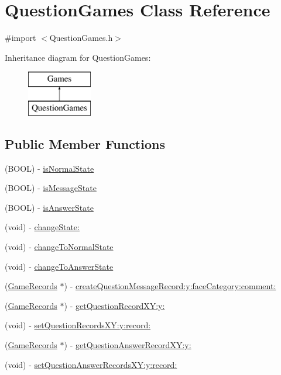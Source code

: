 \hypertarget{interface_question_games}{
\section{QuestionGames Class Reference}
\label{interface_question_games}
}


{\ttfamily \#import $<$QuestionGames.h$>$}

Inheritance diagram for QuestionGames:\begin{figure}[H]
\begin{center}
\leavevmode
\includegraphics[height=2.000000cm]{interface_question_games}
\end{center}
\end{figure}
\subsection*{Public Member Functions}
\begin{DoxyCompactItemize}
\item 
(BOOL) -\/ \hyperlink{interface_question_games_a3c881d4e05359466b662b833b1b87c13}{isNormalState}
\item 
(BOOL) -\/ \hyperlink{interface_question_games_a684bb179665deb81ac8df288fe9a1dff}{isMessageState}
\item 
(BOOL) -\/ \hyperlink{interface_question_games_a4a1f42cca11e99e106ad199b7b6135b3}{isAnswerState}
\item 
(void) -\/ \hyperlink{interface_question_games_a1c8c97ca3941d03f9b5a67ebcddfaed2}{changeState:}
\item 
(void) -\/ \hyperlink{interface_question_games_a7c16b336492619016d621312e8cd4d93}{changeToNormalState}
\item 
(void) -\/ \hyperlink{interface_question_games_ae23e5870fc4e09e063a9323afed8af7d}{changeToAnswerState}
\item 
(\hyperlink{interface_game_records}{GameRecords} $\ast$) -\/ \hyperlink{interface_question_games_a5ca598357da635f2db637633e131f688}{createQuestionMessageRecord:y:faceCategory:comment:}
\item 
(\hyperlink{interface_game_records}{GameRecords} $\ast$) -\/ \hyperlink{interface_question_games_ae30ef678dd08de65c94ff028ad7cd4b4}{getQuestionRecordXY:y:}
\item 
(void) -\/ \hyperlink{interface_question_games_a8b4be5f0802f2078c7bbba9774654996}{setQuestionRecordsXY:y:record:}
\item 
(\hyperlink{interface_game_records}{GameRecords} $\ast$) -\/ \hyperlink{interface_question_games_a182b27435ddbaceb91ddf916cc6b942c}{getQuestionAnswerRecordXY:y:}
\item 
(void) -\/ \hyperlink{interface_question_games_ad9922cc0296c85f3e352449db7f45186}{setQuestionAnswerRecordsXY:y:record:}
\end{DoxyCompactItemize}
